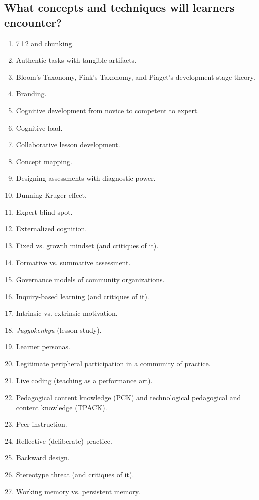 \subsection*{What concepts and techniques will learners encounter?}

  \begin{enumerate}
  \item
    7±2 and chunking.
  \item
    Authentic tasks with tangible artifacts.
  \item
    Bloom's Taxonomy, Fink's Taxonomy, and Piaget's development
    stage theory.
  \item
    Branding.
  \item
    Cognitive development from novice to competent to expert.
  \item
    Cognitive load.
  \item
    Collaborative lesson development.
  \item
    Concept mapping.
  \item
    Designing assessments with diagnostic power.
  \item
    Dunning-Kruger effect.
  \item
    Expert blind spot.
  \item
    Externalized cognition.
  \item
    Fixed vs. growth mindset (and critiques of it).
  \item
    Formative vs. summative assessment.
  \item
    Governance models of community organizations.
  \item
    Inquiry-based learning (and critiques of it).
  \item
    Intrinsic vs. extrinsic motivation.
  \item
    \emph{Jugyokenkyu} (lesson study).
  \item
    Learner personas.
  \item
    Legitimate peripheral participation in a community of practice.
  \item
    Live coding (teaching as a performance art).
  \item
    Pedagogical content knowledge (PCK) and technological
    pedagogical and content knowledge (TPACK).
  \item
    Peer instruction.
  \item
    Reflective (deliberate) practice.
  \item
    Backward design.
  \item
    Stereotype threat (and critiques of it).
  \item
    Working memory vs. persistent memory.
  \end{enumerate}

